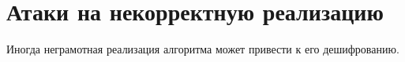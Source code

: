 \documentclass[12pt,a4paper]{scrartcl}
\begin{document}
\section{Атаки на некорректную реализацию}

Иногда неграмотная  реализация алгоритма может привести к его дешифрованию.
\end{document}
